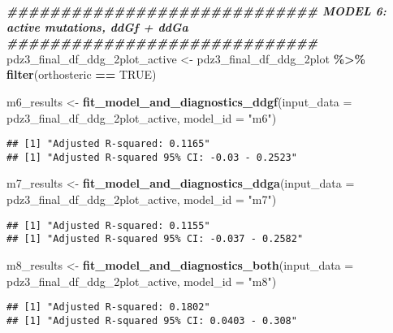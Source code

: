 \documentclass[
]{article}
\newenvironment{Shaded}{\begin{snugshade}}{\end{snugshade}}
\newcommand{\AttributeTok}[1]{\textcolor[rgb]{0.13,0.29,0.53}{#1}}
\newcommand{\ConstantTok}[1]{\textcolor[rgb]{0.56,0.35,0.01}{#1}}
\newcommand{\DocumentationTok}[1]{\textcolor[rgb]{0.56,0.35,0.01}{\textbf{\textit{#1}}}}
\newcommand{\FunctionTok}[1]{\textcolor[rgb]{0.13,0.29,0.53}{\textbf{#1}}}
\newcommand{\NormalTok}[1]{#1}
\newcommand{\OtherTok}[1]{\textcolor[rgb]{0.56,0.35,0.01}{#1}}
\newcommand{\SpecialCharTok}[1]{\textcolor[rgb]{0.81,0.36,0.00}{\textbf{#1}}}
\newcommand{\StringTok}[1]{\textcolor[rgb]{0.31,0.60,0.02}{#1}}
\begin{document}
\begin{Shaded}
\begin{Highlighting}[]
\DocumentationTok{\#\#\#\#\#\#\#\#\#\#\#\#\#\#\#\#\#\#\#\#\#\#\#\#\#\#\#\#\# MODEL 6: active mutations, ddGf + ddGa \#\#\#\#\#\#\#\#\#\#\#\#\#\#\#\#\#\#\#\#\#\#\#\#\#\#\#\#\#}
\NormalTok{pdz3\_final\_df\_ddg\_2plot\_active }\OtherTok{\textless{}{-}}\NormalTok{ pdz3\_final\_df\_ddg\_2plot }\SpecialCharTok{\%\textgreater{}\%} \FunctionTok{filter}\NormalTok{(orthosteric }\SpecialCharTok{==} \ConstantTok{TRUE}\NormalTok{)}

\NormalTok{m6\_results }\OtherTok{\textless{}{-}} \FunctionTok{fit\_model\_and\_diagnostics\_ddgf}\NormalTok{(}\AttributeTok{input\_data =}\NormalTok{ pdz3\_final\_df\_ddg\_2plot\_active, }\AttributeTok{model\_id =} \StringTok{"m6"}\NormalTok{)}
\end{Highlighting}
\end{Shaded}

\begin{verbatim}
## [1] "Adjusted R-squared: 0.1165"
## [1] "Adjusted R-squared 95% CI: -0.03 - 0.2523"
\end{verbatim}

\begin{Shaded}
\begin{Highlighting}[]
\NormalTok{m7\_results }\OtherTok{\textless{}{-}} \FunctionTok{fit\_model\_and\_diagnostics\_ddga}\NormalTok{(}\AttributeTok{input\_data =}\NormalTok{ pdz3\_final\_df\_ddg\_2plot\_active, }\AttributeTok{model\_id =} \StringTok{"m7"}\NormalTok{)}
\end{Highlighting}
\end{Shaded}

\begin{verbatim}
## [1] "Adjusted R-squared: 0.1155"
## [1] "Adjusted R-squared 95% CI: -0.037 - 0.2582"
\end{verbatim}

\begin{Shaded}
\begin{Highlighting}[]
\NormalTok{m8\_results }\OtherTok{\textless{}{-}} \FunctionTok{fit\_model\_and\_diagnostics\_both}\NormalTok{(}\AttributeTok{input\_data =}\NormalTok{ pdz3\_final\_df\_ddg\_2plot\_active, }\AttributeTok{model\_id =} \StringTok{"m8"}\NormalTok{)}
\end{Highlighting}
\end{Shaded}

\begin{verbatim}
## [1] "Adjusted R-squared: 0.1802"
## [1] "Adjusted R-squared 95% CI: 0.0403 - 0.308"
\end{verbatim}
\end{document}
